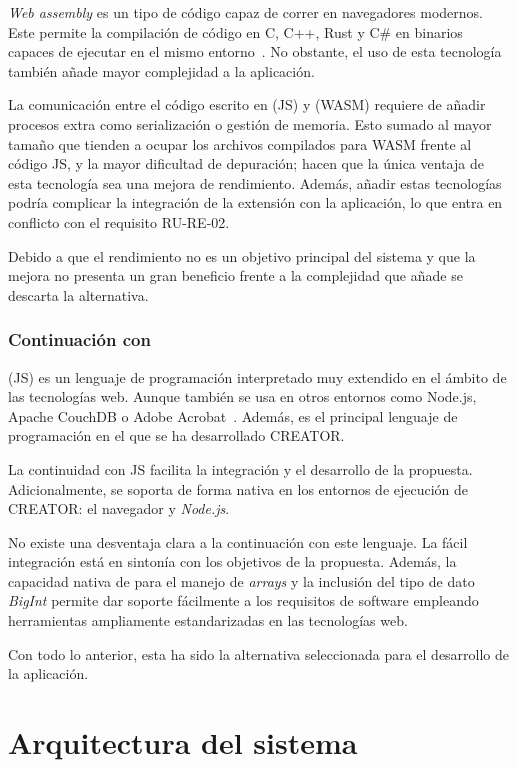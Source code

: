 \textit{Web assembly} es un tipo de código capaz de correr en navegadores modernos. Este permite la compilación de código en C, C++, Rust y C\# en binarios capaces de ejecutar en el mismo entorno~\cite{webassembly}. No obstante, el uso de esta tecnología también añade mayor complejidad a la aplicación.

La comunicación entre el código escrito en \js (JS) y \wa (WASM) requiere de añadir procesos extra como serialización o gestión de memoria. Esto sumado al mayor tamaño que tienden a ocupar los archivos compilados para WASM frente al código JS, y la mayor dificultad de depuración; hacen que la única ventaja de esta tecnología sea una mejora de rendimiento. Además, añadir estas tecnologías podría complicar la integración de la extensión con la aplicación, lo que entra en conflicto con el requisito RU-RE-02.

Debido a que el rendimiento no es un objetivo principal del sistema y que la mejora no presenta un gran beneficio frente a la complejidad que añade se descarta la alternativa.

\subsubsection{Continuación con \js}
{\js} (JS) es un lenguaje de programación interpretado muy extendido
en el ámbito de las tecnologías web. Aunque también se usa en otros entornos como
Node.js, Apache CouchDB o Adobe Acrobat~\cite{javascript}. Además, es el
principal lenguaje de programación en el que se ha desarrollado CREATOR\@.

La continuidad con JS facilita la integración y el desarrollo de la propuesta.
Adicionalmente, se soporta de forma nativa en los entornos de ejecución de
CREATOR: el navegador y \textit{Node.js}\@.

No existe una desventaja clara a la continuación con este lenguaje. La fácil integración está en sintonía con los objetivos de la propuesta. Además, la capacidad nativa de {\js} para el manejo de \textit{arrays} y la inclusión del tipo de dato \textit{BigInt} permite dar soporte fácilmente a los requisitos de software empleando herramientas ampliamente estandarizadas en las tecnologías web.

Con todo lo anterior, esta ha sido la alternativa seleccionada para el desarrollo de la aplicación.

\section{Arquitectura del sistema}\label{sec:arch-design}

